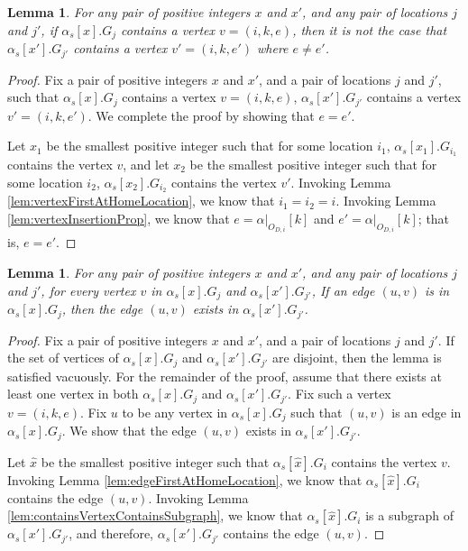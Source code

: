 \documentclass[11pt]{article}
\numberwithin{theorem}{section}
\newtheorem{lemma}[theorem]{Lemma}
\begin{document}
\begin{lemma} \label{lem:sameIndexSameEvent}
For any pair of positive integers $x$ and $x'$, and any pair of locations $j$ and $j'$, if $\alpha_s[x].G_j$ contains a vertex $v = (i,k,e)$, then it is not the case that $\alpha_s[x'].G_{j'}$ contains a vertex $v' = (i,k,e')$ where $e \neq e'$.
\end{lemma}
\begin{proof}
Fix a pair of positive integers $x$ and $x'$, and a pair of locations $j$ and $j'$, such that $\alpha_s[x].G_j$ contains a vertex $v = (i,k,e)$, $\alpha_s[x'].G_{j'}$ contains a vertex $v' = (i,k,e')$. We complete the proof by showing that $e = e'$.

Let $x_1$ be the smallest positive integer such that for some location $i_1$, $\alpha_s[x_1].G_{i_1}$ contains the vertex $v$, and let $x_2$ be the smallest positive integer such that for some location $i_2$, $\alpha_s[x_2].G_{i_2}$ contains the vertex $v'$. Invoking Lemma \ref{lem:vertexFirstAtHomeLocation}, we know that $i_1 = i_2 = i$. Invoking Lemma \ref{lem:vertexInsertionProp}, we know that $e = \alpha|_{O_{D,i}}[k]$ and $e'= \alpha|_{O_{D,i}}[k]$; that is, $e=e'$.
\end{proof}

\begin{lemma}\label{lem:sameVertexSameIncomingEdges}
For any pair of positive integers $x$ and $x'$, and any pair of locations $j$ and $j'$, for every vertex $v$ in $\alpha_s[x].G_j$ and $\alpha_s[x'].G_{j'}$, If an edge $(u,v)$ is in $\alpha_s[x].G_j$, then the edge $(u,v)$ exists in $\alpha_s[x'].G_{j'}$.
\end{lemma}
\begin{proof}
Fix a pair of positive integers $x$ and $x'$, and a pair of locations $j$ and $j'$. If the set of vertices of $\alpha_s[x].G_j$ and $\alpha_s[x'].G_{j'}$ are disjoint, then the lemma is satisfied vacuously. For the remainder of the proof, assume that there exists at least one vertex in both $\alpha_s[x].G_j$ and $\alpha_s[x'].G_{j'}$. Fix such a vertex $v = (i,k,e)$. Fix $u$ to be any vertex in $\alpha_s[x].G_j$ such that $(u,v)$ is an edge in $\alpha_s[x].G_j$. We show that the edge $(u,v)$ exists in $\alpha_s[x'].G_{j'}$.

Let $\hat{x}$ be the smallest positive integer such that $\alpha_s[\hat{x}].G_i$ contains the vertex $v$. Invoking Lemma \ref{lem:edgeFirstAtHomeLocation}, we know that $\alpha_s[\hat{x}].G_i$ contains the edge $(u,v)$. Invoking Lemma \ref{lem:containsVertexContainsSubgraph}, we know that $\alpha_s[\hat{x}].G_i$ is a subgraph of $\alpha_s[x'].G_{j'}$, and therefore, $\alpha_s[x'].G_{j'}$ contains the edge $(u,v)$.
\end{proof}
\end{document}
